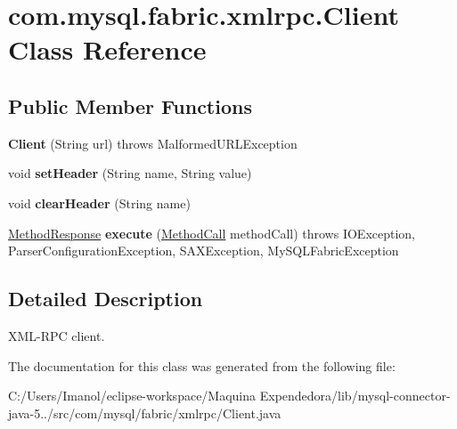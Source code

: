 \hypertarget{classcom_1_1mysql_1_1fabric_1_1xmlrpc_1_1_client}{}\section{com.\+mysql.\+fabric.\+xmlrpc.\+Client Class Reference}
\label{classcom_1_1mysql_1_1fabric_1_1xmlrpc_1_1_client}
\subsection*{Public Member Functions}
\begin{DoxyCompactItemize}
\item 
\mbox{\label{classcom_1_1mysql_1_1fabric_1_1xmlrpc_1_1_client_a1d937bd2cf1b43f42a91d93b1533ba12}} 
{\bfseries Client} (String url)  throws Malformed\+U\+R\+L\+Exception 
\item 
\mbox{\label{classcom_1_1mysql_1_1fabric_1_1xmlrpc_1_1_client_abe3b585efd8e410ea533217a9600b2a7}} 
void {\bfseries set\+Header} (String name, String value)
\item 
\mbox{\label{classcom_1_1mysql_1_1fabric_1_1xmlrpc_1_1_client_ae9fe28bfdf27a2751b23bf46e8babcc8}} 
void {\bfseries clear\+Header} (String name)
\item 
\mbox{\label{classcom_1_1mysql_1_1fabric_1_1xmlrpc_1_1_client_a1ac4ebfc662a6f809ab3d2f6a538ffd1}} 
\mbox{\hyperlink{classcom_1_1mysql_1_1fabric_1_1xmlrpc_1_1base_1_1_method_response}{Method\+Response}} {\bfseries execute} (\mbox{\hyperlink{classcom_1_1mysql_1_1fabric_1_1xmlrpc_1_1base_1_1_method_call}{Method\+Call}} method\+Call)  throws I\+O\+Exception, Parser\+Configuration\+Exception, S\+A\+X\+Exception, My\+S\+Q\+L\+Fabric\+Exception 
\end{DoxyCompactItemize}


\subsection{Detailed Description}
X\+M\+L-\/\+R\+PC client. 

The documentation for this class was generated from the following file\+:\begin{DoxyCompactItemize}
\item 
C\+:/\+Users/\+Imanol/eclipse-\/workspace/\+Maquina Expendedora/lib/mysql-\/connector-\/java-\/5../src/com/mysql/fabric/xmlrpc/Client.\+java\end{DoxyCompactItemize}
